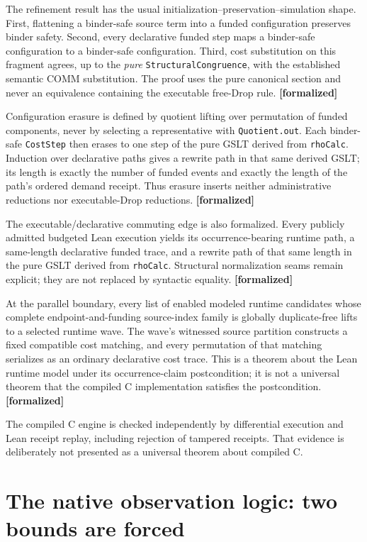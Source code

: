 \documentclass[11pt]{article}
\newcommand{\code}[1]{\texttt{#1}}
\newcommand{\formalized}{\textbf{[formalized]}}
\begin{document}
The refinement result has the usual initialization--preservation--simulation
shape.  First, flattening a binder-safe source term into a funded configuration
preserves binder safety.  Second, every declarative funded step maps a
binder-safe configuration to a binder-safe configuration.  Third, cost
substitution on this fragment agrees, up to the \emph{pure}
\code{StructuralCongruence}, with the established semantic COMM substitution.
The proof uses the pure canonical section and never an equivalence containing
the executable free-Drop rule. \formalized{}

Configuration erasure is defined by quotient lifting over permutation of
funded components, never by selecting a representative with
\code{Quotient.out}.  Each binder-safe \code{CostStep} then erases to one
step of the pure GSLT derived from \code{rhoCalc}.  Induction over declarative
paths gives a rewrite path in that same derived GSLT; its length is exactly the
number of funded events and exactly the length of the path's ordered demand
receipt.  Thus erasure inserts neither administrative reductions nor
executable-Drop reductions. \formalized{}

The executable/declarative commuting edge is also formalized.  Every publicly
admitted budgeted Lean execution yields its occurrence-bearing runtime path, a
same-length declarative funded trace, and a rewrite path of that same length in
the pure GSLT derived from \code{rhoCalc}.  Structural normalization seams
remain explicit; they are not replaced by syntactic equality. \formalized{}

At the parallel boundary, every list of enabled modeled runtime candidates
whose complete endpoint-and-funding source-index family is globally
duplicate-free lifts to a selected runtime wave.  The wave's witnessed source
partition constructs a fixed compatible cost matching, and every permutation
of that matching serializes as an ordinary declarative cost trace.  This is a
theorem about the Lean runtime model under its occurrence-claim postcondition;
it is not a universal theorem that the compiled C implementation satisfies the
postcondition. \formalized{}

The compiled C engine is checked independently by differential execution and
Lean receipt replay, including rejection of tampered receipts.  That evidence
is deliberately not presented as a universal theorem about compiled C.

\section{The native observation logic: two bounds are forced}
\label{sec:native-bounds}
\end{document}
